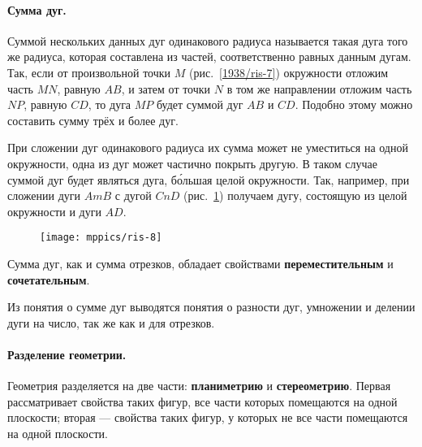 \paragraph{Сумма дуг.}\label{1938/11}
Суммой нескольких данных дуг одинакового радиуса называется такая дуга того же радиуса, которая составлена из частей, соответственно равных данным дугам.
Так, если от произвольной точки $M$ (рис.~\ref{1938/ris-7}) окружности отложим часть $MN$, равную $AB$, и затем от точки $N$ в том же направлении отложим часть $NP$, равную $CD$, то дуга $MP$ будет суммой дуг $AB$ и $CD$.
Подобно этому можно составить сумму трёх и более дуг.

При сложении дуг одинакового радиуса их сумма может не уместиться на одной окружности, одна из дуг может частично покрыть другую.
В таком случае суммой дуг будет являться дуга, б\'{о}льшая целой окружности.
Так, например, при сложении дуги $AmB$ с дугой $CnD$ (рис.~\ref{1938/ris-8}) получаем дугу, состоящую из целой окружности и дуги $AD$.

\begin{figure}[h!]
\centering
\texttt{[image: mppics/ris-8]}
\caption{}\label{1938/ris-8}
\end{figure}


Сумма дуг, как и сумма отрезков, обладает свойствами \textbf{переместительным} и \textbf{сочетательным}.

Из понятия о сумме дуг выводятся понятия о разности дуг, умножении и делении дуги на число, так же как и для отрезков.


\paragraph{Разделение геометрии.}\label{1938/12}
Геометрия разделяется на две части:
\textbf{планиметрию} и \textbf{стереометрию}.
Первая рассматривает свойства таких фигур, все части которых помещаются на одной плоскости;
вторая — свойства таких фигур, у которых не все части помещаются на одной плоскости.
